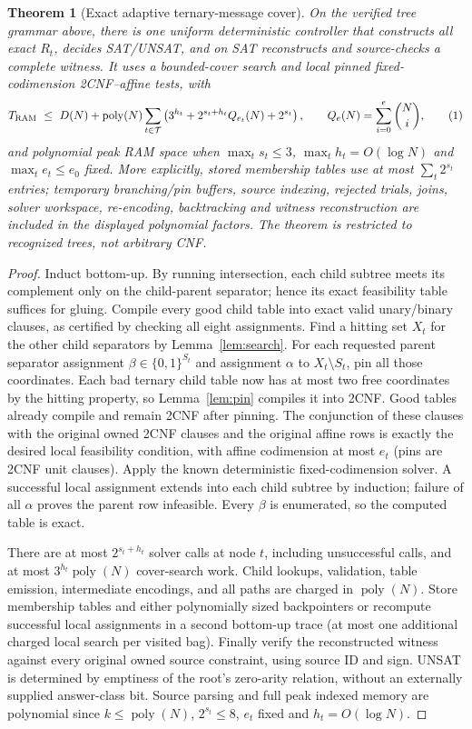 \documentclass[10pt]{article}
\newtheorem{theorem}{Theorem}
\newcommand{\poly}{\operatorname{poly}}
\begin{document}
\begin{theorem}[Exact adaptive ternary-message cover]\label{thm:cover}
On the verified tree grammar above, there is one uniform deterministic controller that constructs all exact $R_t$, decides SAT/UNSAT, and on SAT reconstructs and source-checks a complete witness. It uses a bounded-cover search and local pinned fixed-codimension 2CNF--affine tests, with
\[
T_{\rm RAM}\ \le\ D(N)+\poly(N)\sum_{t\in\mathcal T}
\left(3^{h_t}+2^{s_t+h_t}Q_{e_t}(N)+2^{s_t}\right),\qquad
Q_e(N)=\sum_{i=0}^{e}\binom{N}{i},
\tag{1}
\]
and polynomial peak RAM space when $\max_t s_t\le3$, $\max_t h_t=O(\log N)$ and $\max_t e_t\le e_0$ fixed. More explicitly, stored membership tables use at most $\sum_t2^{s_t}$ entries; temporary branching/pin buffers, source indexing, rejected trials, joins, solver workspace, re-encoding, backtracking and witness reconstruction are included in the displayed polynomial factors. The theorem is restricted to \emph{recognized} trees, not arbitrary CNF.
\end{theorem}
\begin{proof}
Induct bottom-up. By running intersection, each child subtree meets its complement only on the child-parent separator; hence its exact feasibility table suffices for gluing. Compile every good child table into exact valid unary/binary clauses, as certified by checking all eight assignments. Find a hitting set $X_t$ for the other child separators by Lemma~\ref{lem:search}. For each requested parent separator assignment $\beta\in\{0,1\}^{S_t}$ and assignment $\alpha$ to $X_t\setminus S_t$, pin all those coordinates. Each bad ternary child table now has at most two free coordinates by the hitting property, so Lemma~\ref{lem:pin} compiles it into 2CNF. Good tables already compile and remain 2CNF after pinning. The conjunction of these clauses with the original owned 2CNF clauses and the original affine rows is exactly the desired local feasibility condition, with affine codimension at most $e_t$ (pins are 2CNF unit clauses). Apply the known deterministic fixed-codimension solver. A successful local assignment extends into each child subtree by induction; failure of all $\alpha$ proves the parent row infeasible. Every $\beta$ is enumerated, so the computed table is exact.

There are at most $2^{s_t+h_t}$ solver calls at node $t$, including unsuccessful calls, and at most $3^{h_t}\poly(N)$ cover-search work. Child lookups, validation, table emission, intermediate encodings, and all paths are charged in $\poly(N)$. Store membership tables and either polynomially sized backpointers or recompute successful local assignments in a second bottom-up trace (at most one additional charged local search per visited bag). Finally verify the reconstructed witness against every original owned source constraint, using source ID and sign. UNSAT is determined by emptiness of the root's zero-arity relation, without an externally supplied answer-class bit. Source parsing and full peak indexed memory are polynomial since $k\le\poly(N)$, $2^{s_t}\le8$, $e_t$ fixed and $h_t=O(\log N)$.\end{proof}
\end{document}
